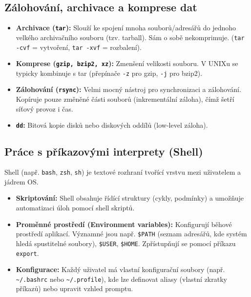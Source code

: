 \subsection{Zálohování, archivace a komprese dat}
\begin{itemize}
    \item \textbf{Archivace (\texttt{tar}):} Slouží ke spojení mnoha souborů/adresářů do jednoho velkého archivačního souboru (tzv. tarball). Sám o sobě nekomprimuje. (\texttt{tar -cvf} = vytvoření, \texttt{tar -xvf} = rozbalení).
    \item \textbf{Komprese (\texttt{gzip, bzip2, xz}):} Zmenšení velikosti souboru. V UNIXu se typicky kombinuje s tar (přepínače \texttt{-z} pro gzip, \texttt{-j} pro bzip2).
    \item \textbf{Zálohování (\texttt{rsync}):} Velmi mocný nástroj pro synchronizaci a zálohování. Kopíruje pouze změněné části souborů (inkrementální záloha), čímž šetří síťový provoz i čas.
    \item \textbf{\texttt{dd}:} Bitová kopie disků nebo diskových oddílů (low-level záloha).
\end{itemize}

\subsection{Práce s příkazovými interprety (Shell)}
Shell (např. \texttt{bash}, \texttt{zsh}, \texttt{sh}) je textové rozhraní tvořící vrstvu mezi uživatelem a jádrem OS.
\begin{itemize}
    \item \textbf{Skriptování:} Shell obsahuje řídící struktury (cykly, podmínky) a umožňuje automatizaci úloh pomocí shell skriptů.
    \item \textbf{Proměnné prostředí (Environment variables):} Konfigurují běhové prostředí aplikací. Významné jsou např. \texttt{\$PATH} (seznam adresářů, kde systém hledá spustitelné soubory), \texttt{\$USER}, \texttt{\$HOME}. Zpřístupňují se pomocí příkazu \texttt{export}.
    \item \textbf{Konfigurace:} Každý uživatel má vlastní konfigurační soubory (např. \texttt{\~{}/.bashrc} nebo \texttt{\~{}/.profile}), kde lze definovat aliasy (vlastní zkratky příkazů) nebo upravit vzhled promptu.
\end{itemize}

